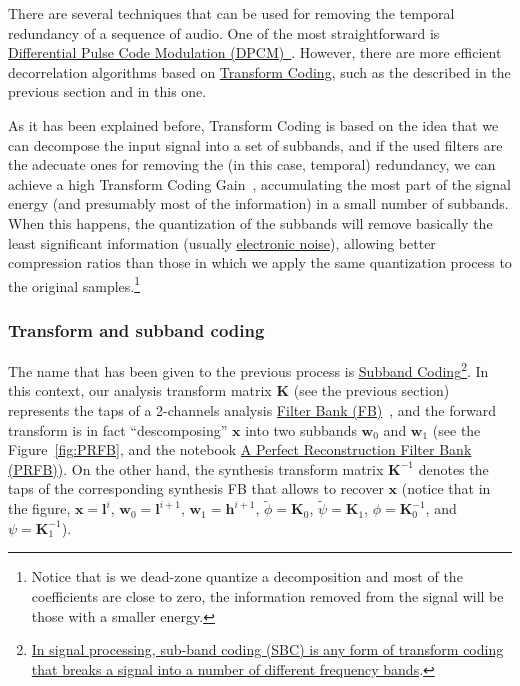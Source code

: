 There are several techniques that can be used for removing the
temporal redundancy of a sequence of audio. One of the most
straightforward is
\href{https://en.wikipedia.org/wiki/Differential_pulse-code_modulation}{Differential
  Pulse Code Modulation
  (DPCM)~\cite{sayood2017introduction}}. However, there are more
efficient decorrelation algorithms based on
\href{https://en.wikipedia.org/wiki/Transform_coding}{Transform
  Coding}, such as the described in the previous section and in this
one.

As it has been explained before, Transform Coding is based on the idea
that we can decompose the input signal into a set of subbands, and if
the used filters are the adecuate ones for removing the (in this case,
temporal) redundancy, we can achieve a high Transform Coding
Gain~\cite{sayood2017introduction}, accumulating the most part of the
signal energy (and presumably most of the information) in a small
number of subbands. When this happens, the quantization of the
subbands will remove basically the least significant information
(usually
\href{https://en.wikipedia.org/wiki/Noise_(electronics)}{electronic
  noise}), allowing better compression ratios than those in which we
apply the same quantization process to the original
samples.\footnote{Notice that is we dead-zone quantize a decomposition
  and most of the coefficients are close to zero, the information
  removed from the signal will be those with a smaller energy.}


\subsubsection{Transform and subband coding}

The name that has been given to the previous process is
\href{https://en.wikipedia.org/wiki/Sub-band_coding}{Subband
  Coding}\footnote{\href{https://en.wikipedia.org/wiki/Sub-band_coding}{In
    signal processing, sub-band coding (SBC) is any form of transform
    coding that breaks a signal into a number of different frequency
    bands}.}. In this context, our analysis transform matrix
${\mathbf K}$ (see the previous section) represents the taps of a
2-channels analysis
\href{https://en.wikipedia.org/wiki/Filter_bank}{Filter Bank
  (FB)}~\cite{vetterli1995wavelets}, and the forward transform is in
fact ``descomposing'' ${\mathbf x}$ into two subbands ${\mathbf w}_0$
and ${\mathbf w}_1$ (see the Figure~\ref{fig:PRFB}, and the notebook
\href{https://github.com/Tecnologias-multimedia/intercom/blob/master/docs/PRFB.ipynb}{A
  Perfect Reconstruction Filter Bank (PRFB)}). On the other hand, the
synthesis transform matrix ${\mathbf K}^{-1}$ denotes the taps of the
corresponding synthesis FB that allows to recover ${\mathbf x}$
(notice that in the figure, ${\mathbf x}={\mathbf l}^i$,
${\mathbf w}_0={\mathbf l}^{i+1}$, ${\mathbf w}_1={\mathbf h}^{i+1}$,
$\tilde\phi={\mathbf K}_0$, $\tilde\psi={\mathbf K}_1$,
$\phi={\mathbf K}^{-1}_0$, and $\psi={\mathbf K}^{-1}_1$).

